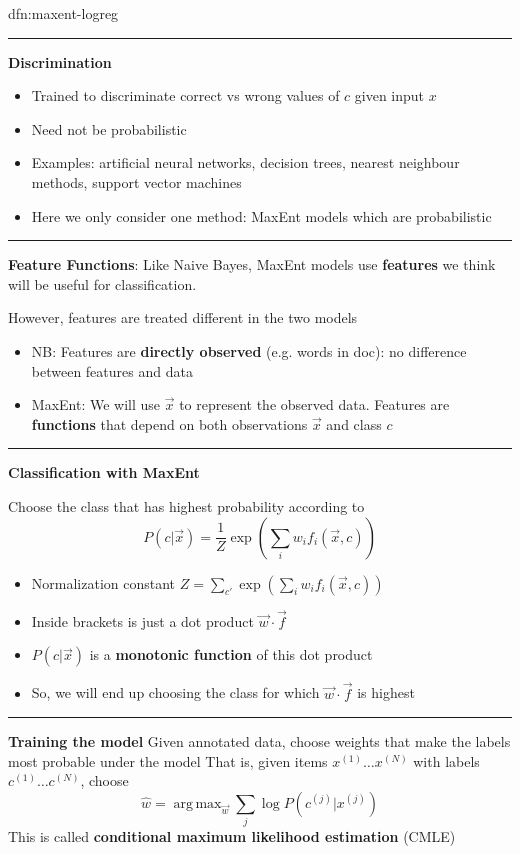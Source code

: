 \documentclass[landscape, 8pt]{extarticle}
\DeclareMathOperator*{\argmax}{arg\,max}
\begin{document}
\begin{multicols}{3}
\begin{dfn}{dfn:maxent-logreg}{}
    \noindent\rule{\textwidth}{0.2pt}

    \textbf{Discrimination}
    \begin{itemize}
        \item Trained to discriminate correct vs wrong values of $c$ given input $x$
        \item Need not be probabilistic
        \item Examples: artificial neural networks, decision trees, nearest neighbour methods, support vector machines
        \item Here we only consider one method: MaxEnt models which are probabilistic
    \end{itemize}

    \noindent\rule{\textwidth}{0.2pt}
    \textbf{Feature Functions}: Like Naive Bayes, MaxEnt models use \textbf{features} we think will be useful for classification.

    However, features are treated different in the two models
    \begin{itemize}
        \setlength\itemsep{0em}
        \item NB: Features are \textbf{directly observed} (e.g. words in doc): no difference between features and data
        \item MaxEnt: We will use $\vec{x}$ to represent the observed data. Features are \textbf{functions} that depend on both observations $\vec{x}$ and class $c$
    \end{itemize}

    \noindent\rule{\textwidth}{0.2pt}
    \textbf{Classification with MaxEnt}
    
    Choose the class that has highest probability according to
    \[P(c | \vec{x}) = \frac{1}{Z} \exp\left(\sum_{i}w_{i}f_{i}(\vec{x}, c)\right)\]
    \begin{itemize}
        \setlength\itemsep{0em}
        \item Normalization constant $Z = \sum_{c'}\exp(\sum_{i}w_{i}f_{i}(\vec{x},c))$
        \item Inside brackets is just a dot product $\vec{w} \cdot \vec{f}$
        \item $P(c|\vec{x})$ is a \textbf{monotonic function} of this dot product
        \item So, we will end up choosing the class for which $\vec{w} \cdot \vec{f}$ is highest
    \end{itemize}

    \noindent\rule{\textwidth}{0.2pt}
    \textbf{Training the model}
    Given annotated data, choose weights that make the labels most probable under the model
    That is, given items $x^{(1)}\dots x^{(N)}$ with labels $c^{(1)}\dots c^{(N)}$, choose
    \[\hat{w} = \argmax_{\vec{w}} \sum_{j} \log P(c^{(j)} | x^{(j)})\]
    This is called \textbf{conditional maximum likelihood estimation} (CMLE)


\end{dfn}
\end{multicols}
\end{document}
